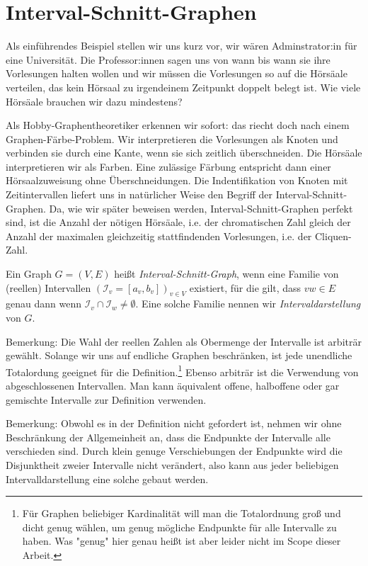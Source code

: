 \documentclass[../main.tex]{subfiles}
\begin{document}
\chapter{Interval-Schnitt-Graphen}
\label{chapter:interval-schnitt-graphen}

Als einführendes Beispiel stellen wir uns kurz vor, wir wären Adminstrator:in für eine Universität. Die Professor:innen sagen uns von wann bis wann sie ihre Vorlesungen halten wollen und wir müssen die Vorlesungen so auf die Hörsäale verteilen, das kein Hörsaal zu irgendeinem Zeitpunkt doppelt belegt ist. Wie viele Hörsäale brauchen wir dazu mindestens?

Als Hobby-Graphentheoretiker erkennen wir sofort: das riecht doch nach einem Graphen-Färbe-Problem. Wir interpretieren die Vorlesungen als Knoten und verbinden sie durch eine Kante, wenn sie sich zeitlich überschneiden. Die Hörsäale interpretieren wir als Farben. Eine zulässige Färbung entspricht dann einer Hörsaalzuweisung ohne Überschneidungen. Die Indentifikation von Knoten mit Zeitintervallen liefert uns in natürlicher Weise den Begriff der Interval-Schnitt-Graphen. Da, wie wir später beweisen werden, Interval-Schnitt-Graphen perfekt sind, ist die Anzahl der nötigen Hörsäale, i.e. der chromatischen Zahl gleich der Anzahl der maximalen gleichzeitig stattfindenden Vorlesungen, i.e. der Cliquen-Zahl.

\begin{definition}
    Ein Graph $G = (V, E)$ heißt \emph{Interval-Schnitt-Graph}, wenn eine Familie von (reellen) Intervallen $(\mathcal I_v = [a_v, b_v])_{v\in V}$ existiert, für die gilt, dass $vw\in E$ genau dann wenn $\mathcal I_v \cap \mathcal I_w \neq \emptyset$. Eine solche Familie nennen wir \emph{Intervaldarstellung} von $G$.
\end{definition}

Bemerkung: Die Wahl der reellen Zahlen als Obermenge der Intervalle ist arbiträr gewählt. Solange wir uns auf endliche Graphen beschränken, ist jede unendliche Totalordung geeignet für die Definition.\footnote{Für Graphen beliebiger Kardinalität will man die Totalordnung groß und dicht genug wählen, um genug mögliche Endpunkte für alle Intervalle zu haben. Was "genug" hier genau heißt ist aber leider nicht im Scope dieser Arbeit.} Ebenso arbiträr ist die Verwendung von abgeschlossenen Intervallen. Man kann äquivalent offene, halboffene oder gar gemischte Intervalle zur Definition verwenden. 

Bemerkung: Obwohl es in der Definition nicht gefordert ist, nehmen wir ohne Beschränkung der Allgemeinheit an, dass die Endpunkte der Intervalle alle verschieden sind. Durch klein genuge Verschiebungen der Endpunkte wird die Disjunktheit zweier Intervalle nicht verändert, also kann aus jeder beliebigen Intervalldarstellung eine solche gebaut werden.
\end{document}
